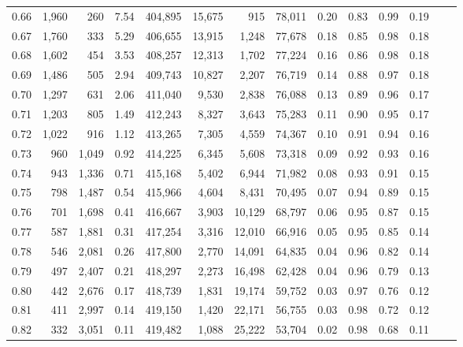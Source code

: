 \begin{tabular}{rrrrrrrrrrrrrr}
0.66 &  1,960 &    260 &     7.54 &  404,895 &   15,675 &     915 &  78,011 &  0.20 &  0.83 &  0.99 &      0.19 \\
0.67 &  1,760 &    333 &     5.29 &  406,655 &   13,915 &   1,248 &  77,678 &  0.18 &  0.85 &  0.98 &      0.18 \\
0.68 &  1,602 &    454 &     3.53 &  408,257 &   12,313 &   1,702 &  77,224 &  0.16 &  0.86 &  0.98 &      0.18 \\
0.69 &  1,486 &    505 &     2.94 &  409,743 &   10,827 &   2,207 &  76,719 &  0.14 &  0.88 &  0.97 &      0.18 \\
0.70 &  1,297 &    631 &     2.06 &  411,040 &    9,530 &   2,838 &  76,088 &  0.13 &  0.89 &  0.96 &      0.17 \\
0.71 &  1,203 &    805 &     1.49 &  412,243 &    8,327 &   3,643 &  75,283 &  0.11 &  0.90 &  0.95 &      0.17 \\
0.72 &  1,022 &    916 &     1.12 &  413,265 &    7,305 &   4,559 &  74,367 &  0.10 &  0.91 &  0.94 &      0.16 \\
0.73 &    960 &  1,049 &     0.92 &  414,225 &    6,345 &   5,608 &  73,318 &  0.09 &  0.92 &  0.93 &      0.16 \\
0.74 &    943 &  1,336 &     0.71 &  415,168 &    5,402 &   6,944 &  71,982 &  0.08 &  0.93 &  0.91 &      0.15 \\
0.75 &    798 &  1,487 &     0.54 &  415,966 &    4,604 &   8,431 &  70,495 &  0.07 &  0.94 &  0.89 &      0.15 \\
0.76 &    701 &  1,698 &     0.41 &  416,667 &    3,903 &  10,129 &  68,797 &  0.06 &  0.95 &  0.87 &      0.15 \\
0.77 &    587 &  1,881 &     0.31 &  417,254 &    3,316 &  12,010 &  66,916 &  0.05 &  0.95 &  0.85 &      0.14 \\
0.78 &    546 &  2,081 &     0.26 &  417,800 &    2,770 &  14,091 &  64,835 &  0.04 &  0.96 &  0.82 &      0.14 \\
0.79 &    497 &  2,407 &     0.21 &  418,297 &    2,273 &  16,498 &  62,428 &  0.04 &  0.96 &  0.79 &      0.13 \\
0.80 &    442 &  2,676 &     0.17 &  418,739 &    1,831 &  19,174 &  59,752 &  0.03 &  0.97 &  0.76 &      0.12 \\
0.81 &    411 &  2,997 &     0.14 &  419,150 &    1,420 &  22,171 &  56,755 &  0.03 &  0.98 &  0.72 &      0.12 \\
0.82 &    332 &  3,051 &     0.11 &  419,482 &    1,088 &  25,222 &  53,704 &  0.02 &  0.98 &  0.68 &      0.11 \\

\end{tabular}

